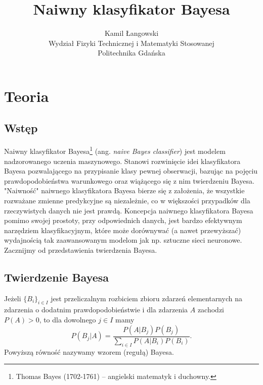 \documentclass[a4paper]{article}
\title{Naiwny klasyfikator Bayesa}
\author{Kamil Łangowski \\ Wydział Fizyki Technicznej i Matematyki Stosowanej \\ Politechnika Gdańska}
\begin{document}
\maketitle
\newpage
\section{Teoria}
\subsection{Wstęp}
Naiwny klasyfikator Bayesa\footnote{Thomas Bayes (1702-1761) -- angielski matematyk i duchowny.} (ang. \textit{naive Bayes classifier}) jest modelem nadzorowanego uczenia maszynowego.  Stanowi rozwinięcie idei klasyfikatora Bayesa pozwalającego na przypisanie klasy pewnej obserwacji, bazując na pojęciu prawdopodobieństwa warunkowego oraz wiążącego się z nim twierdzeniu Bayesa. "Naiwność" naiwnego klasyfikatora Bayesa bierze się z założenia, że wszystkie rozważane zmienne predykcyjne są niezależnie, co w większości przypadków dla rzeczywistych danych nie jest prawdą. Koncepcja naiwnego klasyfikatora Bayesa pomimo swojej prostoty, przy odpowiednich danych, jest bardzo efektywnym narzędziem klasyfikacyjnym, które może dorównywać (a nawet przewyższać) wydajnością tak zaawansowanym modelom jak np. sztuczne sieci neuronowe. 
Zacznijmy od przedstawienia twierdzenia Bayesa. 
\subsection{Twierdzenie Bayesa}
Jeżeli $\{B_i\}_{i\in I}$ jest przeliczalnym rozbiciem zbioru zdarzeń elementarnych na zdarzenia o dodatnim prawdopodobieństwie i dla zdarzenia $A$ zachodzi $P(A)>0$, to dla dowolnego $j\in I$ mamy
\begin{equation}
    P(B_j|A) = \frac{P(A|B_j)P(B_j)}{\sum_{i\in I}P(A|B_i)P(B_i)}.
\end{equation}
Powyższą równość nazywamy wzorem (regułą) Bayesa. 
\end{document}
